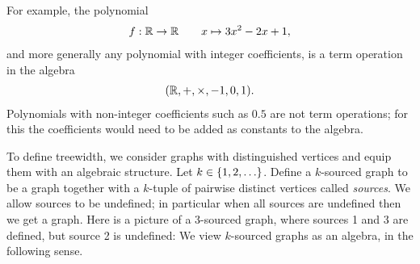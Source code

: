         For example, the polynomial
        \begin{align*}
        f : \mathbb R \to \mathbb R \qquad x \mapsto 3x^2 -2x+1,
        \end{align*}
     and more generally any polynomial with integer coefficients,  is a term operation in the algebra
        \begin{align*}
            (\mathbb R, +,\times, -1,0,1).
        \end{align*}
        Polynomials with non-integer coefficients such as $0.5$  are not term operations; for this the coefficients would need to be added as constants to the algebra. 
        

        
        
 To define treewidth, we consider graphs with distinguished vertices and equip them with an algebraic structure. 
    Let $k \in \{1,2,\ldots\}$. Define a $k$-sourced graph to be a  graph together with a $k$-tuple of pairwise distinct vertices called \emph{sources}. We allow sources to be undefined; in particular when all sources are undefined then we get a graph. Here is a 
    picture of a 3-sourced graph, where sources 1 and 3 are defined, but source 2 is undefined:
    We view  $k$-sourced graphs as an algebra, in the following sense.



